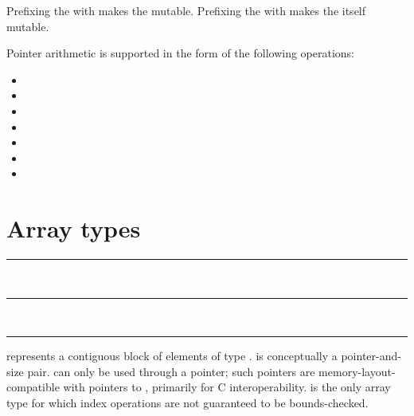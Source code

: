 Prefixing the  with  makes the
 mutable. Prefixing the \code{*} with 
makes the  itself mutable.

\begin{samepage}
Pointer arithmetic is supported in the form of the following operations:

\begin{itemize}
\item {} \code{+} 
\item {} \code{+=} 
\item {} \code{++}
\item {} \code{-} 
\item {} \code{-=} 
\item {} \code{--}
\item {} \code{-} 
\end{itemize}
\end{samepage}

\section{Array types}

\begin{grammar}
\rule{array-type-with-constant-size}  \code{[}  \code{]}\\
\rule{array-type-with-runtime-size}  \code{[} \code{]}\\
\rule{array-type-with-unknown-size}  \code{[}  \code{]}
\end{grammar}

 represents a contiguous block of
 elements of type .
 is conceptually a pointer-and-size
pair.  can only be used through a
pointer; such pointers are memory-layout-compatible with pointers to
, primarily for C interoperability.
 is the only array type for which
index operations are not guaranteed to be bounds-checked.

